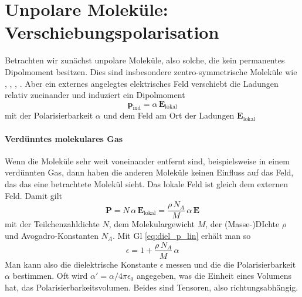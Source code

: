 %

\section{Unpolare Moleküle: Verschiebungspolarisation}

Betrachten wir zunächst unpolare Moleküle, also solche, die kein permanentes Dipolmoment  besitzen. Dies sind insbesondere zentro-symmetrische Moleküle wie , , , . Aber ein externes angelegtes elektrisches Feld verschiebt die Ladungen relativ zueinander und induziert ein Dipolmoment
\begin{equation}
 \mathbf{p}_\text{ind} = \alpha \, \mathbf{E}_\text{lokal}
\end{equation}
mit der Polarisierbarkeit $\alpha$ und dem Feld am Ort der Ladungen $\mathbf{E}_\text{lokal}$

\paragraph{Verdünntes molekulares Gas} Wenn die Moleküle sehr weit voneinander entfernt sind, beispielsweise in einem verdünnten Gas, dann haben die anderen Moleküle keinen Einfluss auf das Feld, das das eine betrachtete Molekül sieht. Das lokale Feld ist gleich dem externen Feld.
 Damit gilt
\begin{equation}
 \mathbf{P} = N \, \alpha \, \mathbf{E}_\text{lokal} =  \frac{\rho \, N_A } {M} \, \alpha \, \mathbf{E} \label{eq:diel_pind}
\end{equation}
mit der Teilchenzahldichte $N$, dem Molekulargewicht $M$, der (Masse-)DIchte $\rho$ und Avogadro-Konstanten $N_A$. Mit Gl \ref{eq:diel_p_lin} erhält man so
\begin{equation}
 \epsilon = 1 +  \frac{\rho \, N_A } {M} \, \alpha  
\end{equation}
Man kann also die dielektrische Konstante $\epsilon$ messen und die die Polarisierbarkeit $\alpha$ bestimmen. Oft wird $\alpha' = \alpha / 4 \pi \epsilon_0$ angegeben, was die Einheit eines Volumens hat, das Polarisierbarkeitsvolumen. Beides sind Tensoren, also richtungsabhängig.

